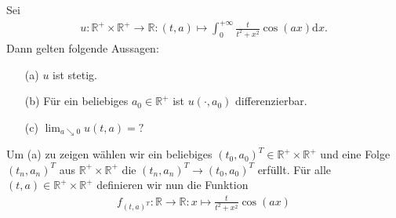 \begin{exercise}
    Sei 
    \begin{align*}
        u:\mathbb{R}^+ \times \mathbb{R}^+ \to \mathbb{R}:(t,a) \mapsto \int_0^{+\infty} \frac{t}{t^2 + x^2} \cos(ax) \mathrm{d}x.
    \end{align*}
    Dann gelten folgende Aussagen:
    \begin{itemize}
        \item[(a)] $u$ ist stetig.
        \item[(b)] Für ein beliebiges $a_0 \in \mathbb{R}^+$ ist $u(\cdot,a_0)$ differenzierbar.
        \item[(c)] $\lim_{a \searrow 0} u(t,a) = ?$ 
    \end{itemize}
\end{exercise}

\begin{solution}
    Um (a) zu zeigen wählen wir ein beliebiges $(t_0,a_0)^T \in \mathbb{R}^+ \times \mathbb{R}^+$ und eine Folge $(t_n,a_n)^T$ aus $\mathbb{R}^+ \times \mathbb{R}^+$ die $(t_n,a_n)^T \to (t_0,a_0)^T$ erfüllt. Für alle $(t,a) \in \mathbb{R}^+ \times \mathbb{R}^+$ definieren wir nun die Funktion 
    \begin{align*}
        f_{(t,a)^T}: \mathbb{R} \to \mathbb{R}: x \mapsto \frac{t}{t^2 + x^2} \cos(ax)
    \end{align*}
\end{solution}